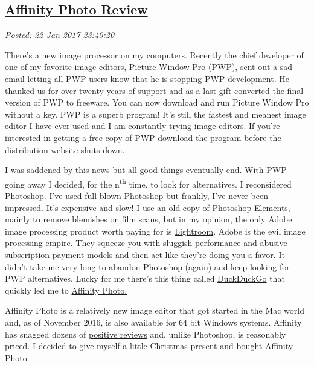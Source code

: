 %

\subsection*{\href{http://analyzethedatanotthedrivel.org/2017/01/22/affinity-photo-review/}{Affinity Photo Review}}


\noindent\emph{Posted: 22 Jan 2017 23:40:20}
\vspace{6pt}

There's a new image processor on my computers. Recently the chief
developer of one of my favorite image editors,
\href{http://www.dl-c.com/}{Picture Window Pro} (PWP), sent out a sad
email letting all PWP users know that he is stopping PWP development. He
thanked us for over twenty years of support and as a last gift converted
the final version of PWP to freeware. You can now download and run
Picture Window Pro without a key. PWP is a superb program! It's still
the fastest and meanest image editor I have ever used and I am
constantly trying image editors. If you're interested in getting a free
copy of PWP download the program before the distribution website shuts
down.

I was saddened by this news but all good things eventually end. With PWP
going away I decided, for the n\textsuperscript{th} time, to look for
alternatives. I reconsidered Photoshop. I've used full-blown Photoshop
but frankly, I've never been impressed. It's expensive and slow! I use
an old copy of Photoshop Elements, mainly to remove blemishes on film
scans, but in my opinion, the only Adobe image processing product worth
paying for is
\href{https://www.adobe.com/products/photoshop-lightroom.html}{Lightroom}.
Adobe is the evil image processing empire. They squeeze you with
sluggish performance and abusive subscription payment models and then
act like they're doing you a favor. It didn't take me very long to
abandon Photoshop (again) and keep looking for PWP alternatives. Lucky
for me there's this thing called
\href{https://start.duckduckgo.com/}{DuckDuckGo} that quickly led me to
\href{https://affinity.serif.com/en-us/}{Affinity Photo.}

Affinity Photo is a relatively new image editor that got started in the
Mac world and, as of November 2016, is also available for 64 bit Windows
systems. Affinity has snagged dozens of
\href{https://fstoppers.com/photoshop/affinity-photo-finally-true-alternative-photoshop-windows-153211}{positive
reviews} and, unlike Photoshop, is reasonably priced. I decided to give
myself a little Christmas present and bought Affinity Photo.

